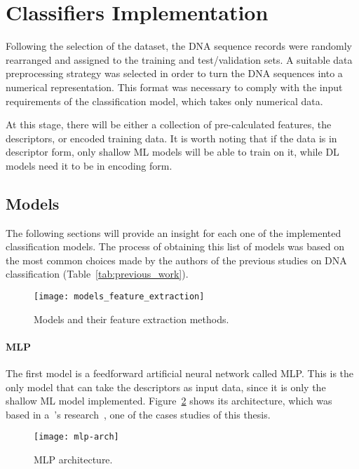 \section{Classifiers Implementation}\label{sec:classifiers}

Following the selection of the dataset, the \gls{DNA} sequence records were randomly rearranged and assigned to the training and test/validation sets. A suitable data preprocessing strategy was selected in order to turn the \gls{DNA} sequences into a numerical representation. This format was necessary to comply with the input requirements of the classification model, which takes only numerical data.

At this stage, there will be either a collection of pre-calculated features, the descriptors, or encoded training data. It is worth noting that if the data is in descriptor form, only shallow \gls{ML} models will be able to train on it, while \gls{DL} models need it to be in encoding form.

\subsection{Models}

The following sections will provide an insight for each one of the implemented classification models. The process of obtaining this list of models was based on the most common choices made by the authors of the previous studies on \gls{DNA} classification (Table~\ref{tab:previous_work}).

\begin{figure}[htbp]
    \centering
    \texttt{[image: models\_feature\_extraction]}
    \caption{Models and their feature extraction methods.}
    \label{fig:models_feature_extraction}
\end{figure}

\paragraph{MLP}

The first model is a feedforward artificial neural network called \gls{MLP}. This is the only model that can take the descriptors as input data, since it is only the shallow \gls{ML} model implemented. Figure~\ref{fig:mlp-arch} shows its architecture, which was based in a~\citeauthor{Zhang2020DeepHE:Learning}'s research~\cite{Zhang2020DeepHE:Learning}, one of the cases studies of this thesis.

\begin{figure}[htbp]
    \centering
    \texttt{[image: mlp-arch]}
    \caption{MLP architecture.}
    \label{fig:mlp-arch}
\end{figure}

